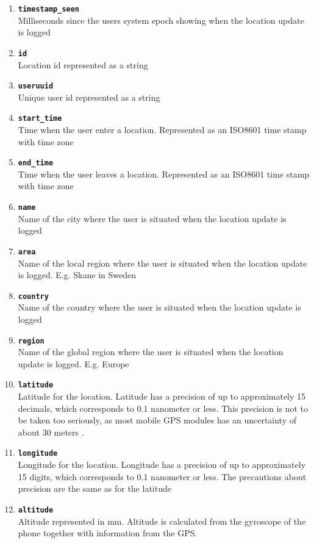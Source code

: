 \begin{enumerate}
\item \texttt{\textbf{timestamp\_seen}}\\Milliseconds since the users system epoch showing when the location update is logged  
\item \texttt{\textbf{id}}\\Location id represented as a string  
\item \texttt{\textbf{useruuid}}\\Unique user id represented as a string 
\item \texttt{\textbf{start\_time}}\\Time when the user enter a location. Represented as an ISO8601 time stamp with time zone 
\item \texttt{\textbf{end\_time}}\\Time when the user leaves a location. Represented as an ISO8601 time stamp with time zone
\item \texttt{\textbf{name}}\\Name of the city where the user is situated when the location update is logged 
\item \texttt{\textbf{area}}\\Name of the local region where the user is situated when the location update is logged. E.g. Skane in Sweden 
\item \texttt{\textbf{country}}\\Name of the country where the user is situated when the location update is logged 
\item \texttt{\textbf{region}}\\Name of the global region where the user is situated when the location update is logged. E.g. Europe
\item \texttt{\textbf{latitude}}\\Latitude for the location. Latitude has a precision of up to approximately 15 decimals, which corresponds to 0.1 nanometer or less. This precision is not to be taken too seriously, as most mobile GPS modules has an uncertainty of about 30 meters   \cite{NAV:8292634}.  
\item \texttt{\textbf{longitude}}\\Longitude for the location. Longitude has a precision of up to approximately 15 digits, which corresponds to 0.1 nanometer or less. The precautions about precision are the same as for the latitude 
\item \texttt{\textbf{altitude}}\\Altitude represented in mm. Altitude is calculated from the gyroscope of the phone together with information from the GPS.  

\end{enumerate}

